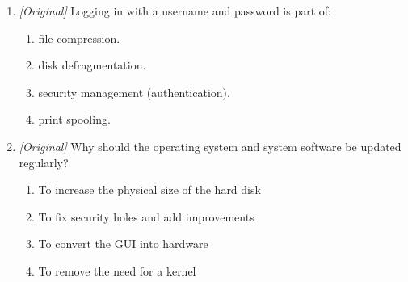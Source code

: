 \documentclass[11pt]{article}
\begin{document}
\begin{enumerate}[label=\textbf{Q\arabic*.}, leftmargin=*]
\begin{enumerate}[label=\Roman*.]
  \end{enumerate}
  \begin{enumerate}[label=\Alph*.]
    \item I and II only
    \item I and III only
    \item II and III only
    \item I, II, and III
  \end{enumerate}
\item \textit{[Original]} Logging in with a username and password is part of:
  \begin{enumerate}[label=\Alph*.]
    \item file compression.
    \item disk defragmentation.
    \item security management (authentication).
    \item print spooling.
  \end{enumerate}
\item \textit{[Original]} Why should the operating system and system software
  be updated regularly?
  \begin{enumerate}[label=\Alph*.]
    \item To increase the physical size of the hard disk
    \item To fix security holes and add improvements
    \item To convert the GUI into hardware
    \item To remove the need for a kernel
  \end{enumerate}


\end{enumerate}
\end{document}
